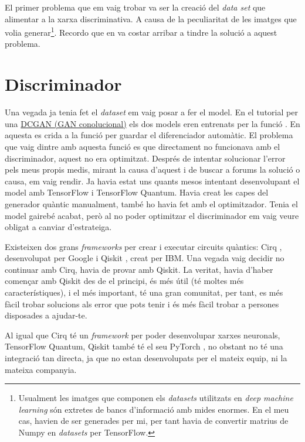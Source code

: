 El primer problema que em vaig trobar va ser la creació del \textit{data set} que alimentar a la xarxa discriminativa. A causa de la peculiaritat de les imatges que volia generar\footnote{Usualment les imatges que componen els \textit{datasets} utilitzats en \textit{deep machine learning} són extretes de bancs d'informació amb mides enormes. En el meu cas, havien de ser generades per mi, per tant havia de convertir matrius de Numpy en \textit{datasets} per TensorFlow.}. Recordo que en va costar arribar a tindre la solució a aquest problema. 

\section{Discriminador}

Una vegada ja tenia fet el \textit{dataset} em vaig posar a fer el model. En el tutorial per una \href{https://www.tensorflow.org/tutorials/generative/dcgan}{DCGAN (GAN conolucional)} els dos models eren entrenats per la funció . En aquesta es crida a la funció  per guardar el diferenciador automàtic. El problema que vaig dintre amb aquesta funció es que directament no funcionava amb el discriminador, aquest no era optimitzat. Després de intentar solucionar l'error pels meus propis medis, mirant la causa d'aquest i de buscar a forums la solució o causa, em vaig rendir. Ja havia estat uns quants mesos intentant desenvolupant el model amb TensorFlow i TensorFlow Quantum. Havia creat les capes del generador quàntic manualment, també ho havia fet amb el optimitzador. Tenia el model gairebé acabat, però al no poder optimitzar el discriminador em vaig veure obligat a canviar d'estrateiga. 

Existeixen dos grans \textit{frameworks} per crear i executar circuits quàntics: Cirq \cite{cirq}, desenvolupat per Google i Qiskit \cite{qiskit}, creat per IBM. Una vegada vaig decidir no continuar amb Cirq, havia de provar amb Qiskit. La veritat, havia d'haber començar amb Qiskit des de el principi, és més útil (té moltes més característiques), i el més important, té una gran comunitat, per tant, es més fàcil trobar solucions als error que pots tenir i és més fàcil trobar a persones disposades a ajudar-te.

Al igual que Cirq té un \textit{framework} per poder desenvolupar xarxes neuronals, TensorFlow Quantum, Qiskit també té el seu PyTorch \cite{pytorch_2019}, no obstant no té una integració tan directa, ja que no estan desenvolupats per el mateix equip, ni la mateixa companyia. 


